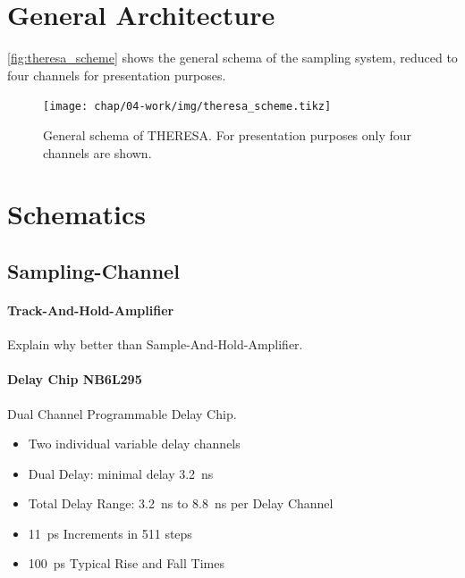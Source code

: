 \section{General Architecture}

\autoref{fig:theresa_scheme} shows the general schema of the sampling system, reduced to four channels for presentation purposes.
\begin{figure}[H]
	\centering
	\texttt{[image: chap/04-work/img/theresa\_scheme.tikz]}
	\caption{General schema of THERESA. For presentation purposes only four channels are shown.}
	\label{fig:theresa_scheme}
\end{figure}



\section{Schematics}
\subsection{Sampling-Channel}
\paragraph{Track-And-Hold-Amplifier}
Explain why better than Sample-And-Hold-Amplifier.
\paragraph{Delay Chip NB6L295}
Dual Channel Programmable Delay Chip.

\begin{itemize}[noitemsep]
	\item Two individual variable delay channels
	\item Dual Delay: minimal delay \SI{3.2}{\nano \second}
	\item Total Delay Range: \SI{3.2}{\nano \second} to \SI{8.8}{\nano \second} per Delay Channel
	\item \SI{11}{\pico \second} Increments in 511 steps
	\item \SI{100}{\pico \second} Typical Rise and Fall Times
\end{itemize}

